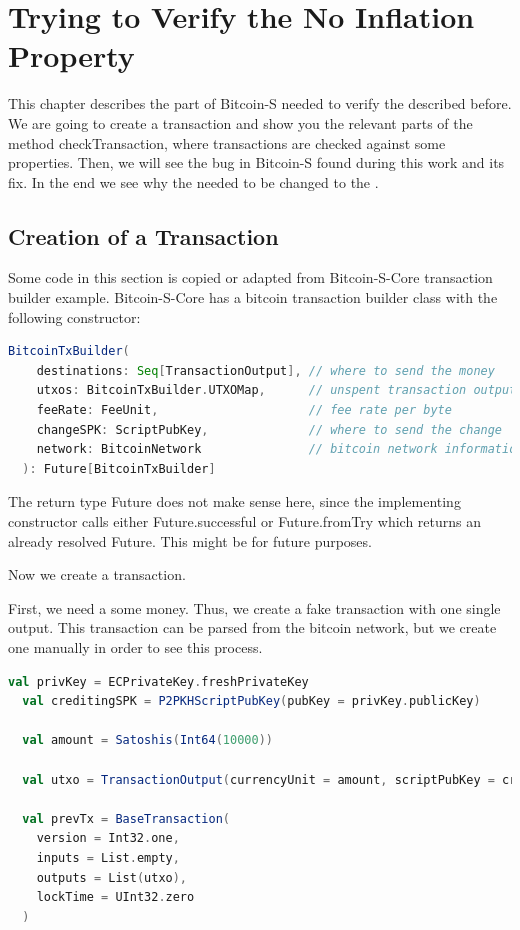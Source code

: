 \chapter{Trying to Verify the No Inflation Property}
\label{chap:verify_check}

This chapter describes the part of Bitcoin-S needed to verify the  described before.
We are going to create a transaction and show you the relevant parts of the method checkTransaction, where transactions are checked against some properties.
Then, we will see the bug in Bitcoin-S found during this work and its fix.
In the end we see why the  needed to be changed to the .


\section{Creation of a Transaction}

Some code in this section is copied or adapted from Bitcoin-S-Core transaction builder example.\cite{BitcoinSCore:txbuilderexample}
Bitcoin-S-Core has a bitcoin transaction builder class with the following constructor:
\begin{lstlisting}[language=scala]
  BitcoinTxBuilder(
    destinations: Seq[TransactionOutput], // where to send the money
    utxos: BitcoinTxBuilder.UTXOMap,      // unspent transaction outputs
    feeRate: FeeUnit,                     // fee rate per byte
    changeSPK: ScriptPubKey,              // where to send the change
    network: BitcoinNetwork               // bitcoin network information
  ): Future[BitcoinTxBuilder]
\end{lstlisting}

The return type Future does not make sense here, since the implementing constructor calls either Future.successful or Future.fromTry which returns an already resolved Future.
This might be for future purposes.

Now we create a transaction.

First, we need a some money.
Thus, we create a fake transaction with one single output.
This transaction can be parsed from the bitcoin network, but we create one manually in order to see this process.
\begin{lstlisting}[language=scala]
  val privKey = ECPrivateKey.freshPrivateKey
  val creditingSPK = P2PKHScriptPubKey(pubKey = privKey.publicKey)

  val amount = Satoshis(Int64(10000))

  val utxo = TransactionOutput(currencyUnit = amount, scriptPubKey = creditingSPK)

  val prevTx = BaseTransaction(
    version = Int32.one,
    inputs = List.empty,
    outputs = List(utxo),
    lockTime = UInt32.zero
  )
\end{lstlisting}

